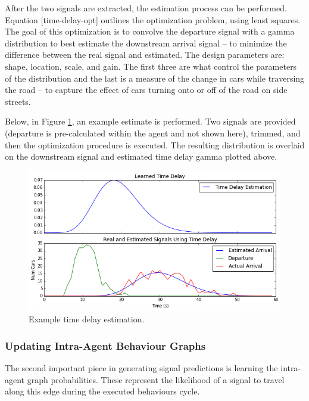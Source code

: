 \documentclass{report}
\begin{document}
After the two signals are extracted, the estimation process can be performed. 
Equation [time-delay-opt] outlines the optimization problem, using least squares. 
The goal of this optimization is to convolve the departure signal with a gamma distribution to best estimate the downstream arrival signal -- to minimize the difference between the real signal and estimated. 
The design parameters are: shape, location, scale, and gain. 
The first three are what control the parameters of the distribution and the last is a measure of the change in cars while traversing the road -- to capture the effect of cars turning onto or off of the road on side streets.

Below, in Figure \ref{fig:time-delay-est}, an example estimate is performed. 
Two signals are provided (departure is pre-calculated within the agent and not shown here), trimmed, and then the optimization procedure is executed. 
The resulting distribution is overlaid on the downstream signal and estimated time delay gamma plotted above.

\begin{figure}[H]
  \begin{centering}
    \includegraphics[scale=0.75]{figures/time-delay-est.png}
    \caption{Example time delay estimation.}
    \label{fig:time-delay-est}
  \end{centering}
\end{figure}


\subsubsection{Updating Intra-Agent Behaviour Graphs}

The second important piece in generating signal predictions is learning the intra-agent graph probabilities. 
These represent the likelihood of a signal to travel along this edge during the executed behaviours cycle.
\end{document}
